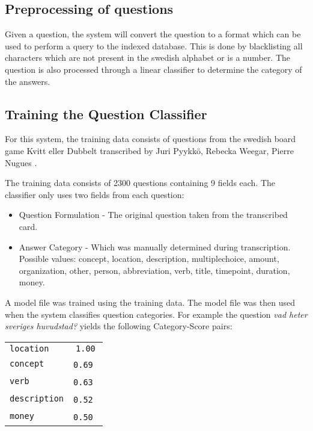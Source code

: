 \subsection{Preprocessing of questions}
Given a question, the system will convert the question
to a format which can be used to perform a query to the indexed
database. This is done by blacklisting all characters which
are not present in the swedish alphabet or is a number. The question is also
processed through a linear classifier to determine the category of the 
answers.

\subsection{Training the Question Classifier}
For this system, the training data consists of questions 
from the swedish board game Kvitt eller Dubbelt transcribed 
by Juri Pyykk\"o, Rebecka Weegar, Pierre Nugues \cite{QASYS}.

The training data consists of 2300 questions containing 9 fields each.
The classifier only uses two fields from each question:
\begin{itemize}
\item Question Formulation - The original question taken from the transcribed
  card.
\item Answer Category - Which was manually determined during transcription. 
  Possible values: concept, location, description, multiplechoice, amount, organization, 
  other, person, abbreviation, verb, title, timepoint, duration, money.
\end{itemize}
A model file was trained using the training data. The model file was then used when the system 
classifies question categories. For example the question \textit{vad heter sveriges huvudstad?} 
yields the following Category-Score pairs:
\begin{center}
  \begin{tabular} {l c}
    \texttt{location}    & \texttt{1.00} \\
    \texttt{concept}     & \texttt{0.69} \\
    \texttt{verb}        & \texttt{0.63} \\
    \texttt{description} & \texttt{0.52} \\
    \texttt{money}       & \texttt{0.50} \\
  \end{tabular}
\end{center}
